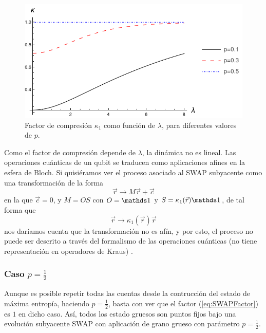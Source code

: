 \begin{figure}[h!]
  \centering
  \includegraphics[width=0.6\linewidth]{maxent/figures/ContractionFactorSWAP_2D_lambda0to8.png}
  \caption{Factor de compresión $\kappa_{1}$ como función de $\lambda$, para diferentes valores de $p$.}
  \label{fig:SWAPFactor2D}
\end{figure}

Como el factor de compresión depende de $\lambda$, la dinámica no es lineal. Las operaciones cuánticas de un qubit se traducen como aplicaciones afines en la esfera de Bloch. Si quisiéramos ver el proceso asociado al \textsc{SWAP} subyacente como una transformación de la forma
\begin{equation*}
  \vec{r}\rightarrow M\vec{r}+\vec{c}
\end{equation*}
en la que $\vec{c}=0$, y $M=OS$ con $O=\Id$ y $S=\kappa_{1}(\vec{r})\Id$, de tal forma que
\begin{equation*}
  \vec{r}\rightarrow \kappa_{1}(\vec{r})\vec{r}
\end{equation*}
nos daríamos cuenta que la transformación no es afín, y por esto, el proceso no puede ser descrito a través del formalismo de las operaciones cuánticas (no tiene representación en operadores de Kraus) \cite{Chuang}.
\subsubsection{Caso $p=\frac{1}{2}$}

Aunque es posible repetir todas las cuentas desde la contrucción del estado de máxima entropía, haciendo $p=\frac{1}{2}$, basta con ver que el factor (\eqref{eq:SWAPFactor}) es $1$ en dicho caso. Así, todos los estado gruesos son puntos fijos bajo una evolución subyacente SWAP con aplicación de grano grueso con parámetro $p=\frac{1}{2}$.

